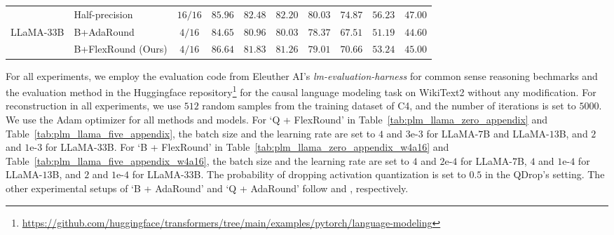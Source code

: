 \documentclass{article}
\theoremstyle{plain}
\theoremstyle{definition}
\theoremstyle{remark}
\begin{document}
\begin{table}[h]
\begin{center}
{\begin{tabular}{clcccccccc}
\midrule
& Half-precision & $16 / 16$ & $85.96$ & $82.48$ & $82.20$ & $80.03$ & $74.87$ & $56.23$ & $47.00$ \\
\cmidrule{2-10}
LLaMA-$33$B & B+AdaRound  & $4 / 16$ & $84.65$ & $80.96$ & $80.03$ & $78.37$ & $67.51$ & $51.19$ & $44.60$ \\
& B+FlexRound (Ours) & $4 / 16$ & $\mathbf{86.64}$ & $\mathbf{81.83}$ & $\mathbf{81.26}$ & $\mathbf{79.01}$ & $\mathbf{70.66}$ & $\mathbf{53.24}$ & $\mathbf{45.00}$ \\
\bottomrule
\end{tabular}
}
\end{center}
\end{table}

For all experiments, we employ the evaluation code from Eleuther AI's \textit{lm-evaluation-harness} \citep{eval-harness} for common sense reasoning bechmarks and the evaluation method in the Huggingface repository\footnote{\url{https://github.com/huggingface/transformers/tree/main/examples/pytorch/language-modeling}} for the causal language modeling task on WikiText2 without any modification. For reconstruction in all experiments, we use $512$ random samples from the training dataset of C4, and the number of iterations is set to $5000$. We use the Adam optimizer for all methods and models. For `Q + FlexRound' in Table~\ref{tab:plm_llama_zero_appendix} and Table~\ref{tab:plm_llama_five_appendix}, the batch size and the learning rate are set to $4$ and $3$e-$3$ for LLaMA-$7$B and LLaMA-$13$B, and $2$ and $1$e-$3$ for LLaMA-$33$B. For `B + FlexRound' in Table~\ref{tab:plm_llama_zero_appendix_w4a16} and Table~\ref{tab:plm_llama_five_appendix_w4a16}, the batch size and the learning rate are set to $4$ and $2$e-$4$ for LLaMA-$7$B, $4$ and $1$e-$4$ for LLaMA-$13$B, and $2$ and $1$e-$4$ for LLaMA-$33$B. The probability of dropping activation quantization is set to $0.5$ in the QDrop's setting. The other experimental setups of `B + AdaRound' and `Q + AdaRound' follow \citet{li2021brecq} and \citet{wei2022qdrop}, respectively. 
\end{document}
